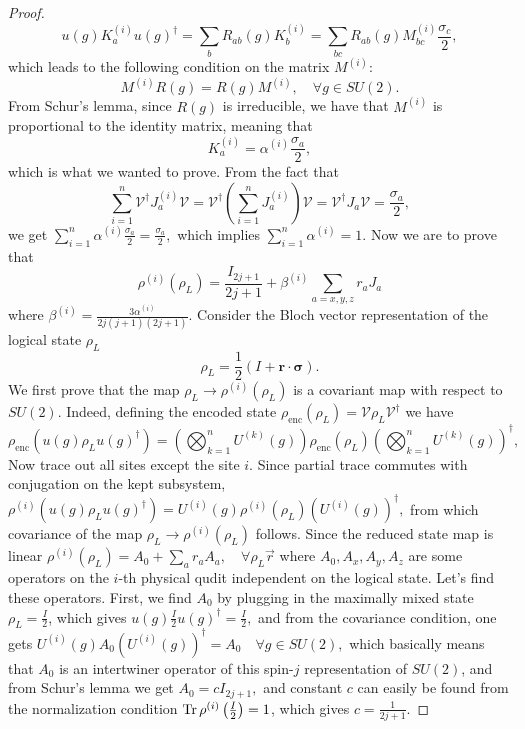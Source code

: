 \documentclass[10pt,twocolumn,superscriptaddress,aps,amsmath,amssymb,citeautoscript,floatfix,prx]{revtex4-2}
\theoremstyle{plain}
\theoremstyle{plain}
\theoremstyle{plain}
\theoremstyle{plain}
\theoremstyle{plain}
\theoremstyle{plain}
\theoremstyle{plain}
\theoremstyle{definition}
\theoremstyle{plain}
\begin{document}
\begin{appendix}
\begin{proof}
    \[
    u(g) K_a^{(i)} u(g)^{\dagger}=\sum_b R_{a b}(g) K_b^{(i)}=\sum_{b c} R_{a b}(g) M_{b c}^{(i)} \frac{\sigma_c}{2},
    \]
    which leads to the following condition on the matrix $M^{(i)}$:
    \[
    M^{(i)} R(g)=R(g) M^{(i)}, \quad \forall g \in SU(2).
    \]
    From Schur's lemma, since $R(g)$ is irreducible, we have that $M^{(i)}$ is proportional to the identity matrix, meaning that
    \[
    K_a^{(i)}=\alpha^{(i)} \frac{\sigma_a}{2},
    \]
    which is what we wanted to prove. From the fact that 
    \[
    \sum_{i=1}^n \mathcal{V}^{\dagger} J_a^{(i)} \mathcal{V} = \mathcal{V}^{\dagger} \left(\sum_{i=1}^n J_a^{(i)}\right) \mathcal{V} = \mathcal{V}^{\dagger} J_a \mathcal{V} = \frac{\sigma_a}{2},
    \]
    we get
    $
    \sum_{i=1}^n \alpha^{(i)} \frac{\sigma_a}{2} = \frac{\sigma_a}{2},
    $
    which implies $\sum_{i=1}^n \alpha^{(i)} = 1$.
    Now we are to prove that
    \begin{equation}\label{supple_reduced_state}
        \rho^{(i)}\left(\rho_L\right)=\frac{I_{2 j+1}}{2 j+1}+\beta^{(i)} \sum_{a=x, y, z} r_a J_a
    \end{equation}
    where
    $
        \beta^{(i)}=\frac{3 \alpha^{(i)}}{2 j(j+1)(2 j+1)}.
    $
    Consider the Bloch vector representation of the logical state $\rho_L$ 
    \[
    \rho_L=\frac{1}{2}(I+\mathbf{r} \cdot \boldsymbol{\sigma}).
    \]
    We first prove that the map $\rho_L \rightarrow \rho^{(i)}\left(\rho_L\right)$ is a covariant map with respect to $SU(2)$. Indeed,
    defining the encoded state
    $
    \rho_{\mathrm{enc}}\left(\rho_L\right)=\mathcal{V} \rho_L \mathcal{V}^{\dagger}
    $
    we have
    \[
    \rho_{\text{enc}}\left(u(g) \rho_L u(g)^{\dagger}\right)=\left(\bigotimes_{k=1}^n U^{(k)}(g)\right)\rho_{\text{enc}}\left(\rho_L\right) \left(\bigotimes_{k=1}^n U^{(k)}(g)\right)^{\dagger},
    \]
    Now trace out all sites except the site $i$. Since partial trace commutes with conjugation on the kept subsystem,
    $
    \rho^{(i)}\left(u(g) \rho_L u(g)^{\dagger}\right)=U^{(i)}(g) \rho^{(i)}\left(\rho_L\right) (U^{(i)}(g))^{\dagger},
    $
    from which covariance of the map $\rho_L \rightarrow \rho^{(i)}\left(\rho_L\right)$ follows.
    Since the reduced state map is linear
    $
        \rho^{(i)}\left(\rho_L\right)=A_0+\sum_a r_a A_a, \quad \forall \rho_L  \vec{r}
    $
    where $A_0, A_x, A_y, A_z$ are some operators on the $i$-th physical qudit independent on the logical state. Let's find these operators. 
    First, we find $A_0$ by plugging in the maximally mixed state $\rho_L = \frac{I}{2}$, which gives
    $
    u(g) \frac{I}{2} u(g)^{\dagger}=\frac{I}{2},
    $
    and from the covariance condition, one gets
    $
    U^{(i)}(g) A_0 (U^{(i)}(g))^{\dagger}=A_0 \quad \forall g \in SU(2),
    $
    which basically means that $A_0$ is an intertwiner operator of this spin-$j$ representation of $SU(2)$, and from Schur's lemma we get
    $
    A_0=c I_{2 j+1},
    $
    and constant $c$ can easily be found from the normalization condition $\Tr \rho^{(i)}\left(\frac{I}{2}\right)=1$, which gives $c=\frac{1}{2 j+1}$. 
    

\end{proof}
\end{appendix}
\end{document}
